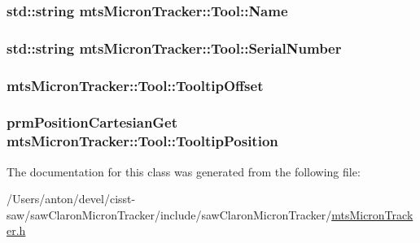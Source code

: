 \subsubsection[{Name}]{\setlength{\rightskip}{0pt plus 5cm}std\+::string mts\+Micron\+Tracker\+::\+Tool\+::\+Name}\label{classmts_micron_tracker_1_1_tool_a99366ed64e7a289aafe66e76b467614e}
\hypertarget{classmts_micron_tracker_1_1_tool_a474f21c01419e5afa938b1a6e0c27257}{}
\subsubsection[{Serial\+Number}]{\setlength{\rightskip}{0pt plus 5cm}std\+::string mts\+Micron\+Tracker\+::\+Tool\+::\+Serial\+Number}\label{classmts_micron_tracker_1_1_tool_a474f21c01419e5afa938b1a6e0c27257}
\hypertarget{classmts_micron_tracker_1_1_tool_a661b9476c03d797ce5800bc887a35ceb}{}
\subsubsection[{Tooltip\+Offset}]{ mts\+Micron\+Tracker\+::\+Tool\+::\+Tooltip\+Offset}\label{classmts_micron_tracker_1_1_tool_a661b9476c03d797ce5800bc887a35ceb}
\hypertarget{classmts_micron_tracker_1_1_tool_a053af3e76832fc8cf0df4dc188e0ce8f}{}
\subsubsection[{Tooltip\+Position}]{\setlength{\rightskip}{0pt plus 5cm}prm\+Position\+Cartesian\+Get mts\+Micron\+Tracker\+::\+Tool\+::\+Tooltip\+Position}\label{classmts_micron_tracker_1_1_tool_a053af3e76832fc8cf0df4dc188e0ce8f}


The documentation for this class was generated from the following file\+:\begin{DoxyCompactItemize}
\item 
/\+Users/anton/devel/cisst-\/saw/saw\+Claron\+Micron\+Tracker/include/saw\+Claron\+Micron\+Tracker/\hyperlink{mts_micron_tracker_8h}{mts\+Micron\+Tracker.\+h}\end{DoxyCompactItemize}
